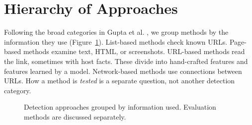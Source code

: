 \documentclass[sigconf,nonacm]{acmart}
\begin{document}
\section{Hierarchy of Approaches}
Following the broad categories in Gupta et al. \cite{gupta}, we group methods by the information they use (Figure~\ref{fig:taxonomy}). List-based methods check known URLs. Page-based methods examine text, HTML, or screenshots. URL-based methods read the link, sometimes with host facts. These divide into hand-crafted features and features learned by a model. Network-based methods use connections between URLs. How a method is \emph{tested} is a separate question, not another detection category.
\begin{figure}[t]
\centering{}
\caption{Detection approaches grouped by information used. Evaluation methods are discussed separately.}\label{fig:taxonomy}
\end{figure}
\end{document}

